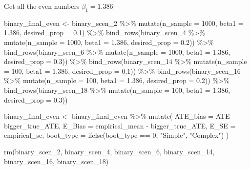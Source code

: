 \documentclass[
]{article}
\newenvironment{Shaded}{\begin{snugshade}}{\end{snugshade}}
\newcommand{\AttributeTok}[1]{\textcolor[rgb]{0.77,0.63,0.00}{#1}}
\newcommand{\DecValTok}[1]{\textcolor[rgb]{0.00,0.00,0.81}{#1}}
\newcommand{\FloatTok}[1]{\textcolor[rgb]{0.00,0.00,0.81}{#1}}
\newcommand{\FunctionTok}[1]{\textcolor[rgb]{0.00,0.00,0.00}{#1}}
\newcommand{\NormalTok}[1]{#1}
\newcommand{\OtherTok}[1]{\textcolor[rgb]{0.56,0.35,0.01}{#1}}
\newcommand{\SpecialCharTok}[1]{\textcolor[rgb]{0.00,0.00,0.00}{#1}}
\newcommand{\StringTok}[1]{\textcolor[rgb]{0.31,0.60,0.02}{#1}}
\begin{document}
Get all the even numbers \(\beta_1 = 1.386\)

\begin{Shaded}
\begin{Highlighting}[]
\NormalTok{binary\_final\_even }\OtherTok{\textless{}{-}} 
\NormalTok{  binary\_scen\_2 }\SpecialCharTok{\%\textgreater{}\%} \FunctionTok{mutate}\NormalTok{(}\AttributeTok{n\_sample =} \DecValTok{1000}\NormalTok{, }\AttributeTok{beta1 =} \FloatTok{1.386}\NormalTok{, }\AttributeTok{desired\_prop =} \FloatTok{0.1}\NormalTok{) }\SpecialCharTok{\%\textgreater{}\%} 
  \FunctionTok{bind\_rows}\NormalTok{(binary\_scen\_4 }\SpecialCharTok{\%\textgreater{}\%} \FunctionTok{mutate}\NormalTok{(}\AttributeTok{n\_sample =} \DecValTok{1000}\NormalTok{, }\AttributeTok{beta1 =} \FloatTok{1.386}\NormalTok{, }\AttributeTok{desired\_prop =} \FloatTok{0.2}\NormalTok{)) }\SpecialCharTok{\%\textgreater{}\%}
 \FunctionTok{bind\_rows}\NormalTok{(binary\_scen\_6 }\SpecialCharTok{\%\textgreater{}\%} \FunctionTok{mutate}\NormalTok{(}\AttributeTok{n\_sample =} \DecValTok{1000}\NormalTok{, }\AttributeTok{beta1 =} \FloatTok{1.386}\NormalTok{, }\AttributeTok{desired\_prop =} \FloatTok{0.3}\NormalTok{)) }\SpecialCharTok{\%\textgreater{}\%}
 \FunctionTok{bind\_rows}\NormalTok{(binary\_scen\_14 }\SpecialCharTok{\%\textgreater{}\%} \FunctionTok{mutate}\NormalTok{(}\AttributeTok{n\_sample =} \DecValTok{100}\NormalTok{, }\AttributeTok{beta1 =} \FloatTok{1.386}\NormalTok{, }\AttributeTok{desired\_prop =} \FloatTok{0.1}\NormalTok{)) }\SpecialCharTok{\%\textgreater{}\%}
 \FunctionTok{bind\_rows}\NormalTok{(binary\_scen\_16 }\SpecialCharTok{\%\textgreater{}\%} \FunctionTok{mutate}\NormalTok{(}\AttributeTok{n\_sample =} \DecValTok{100}\NormalTok{, }\AttributeTok{beta1 =} \FloatTok{1.386}\NormalTok{, }\AttributeTok{desired\_prop =} \FloatTok{0.2}\NormalTok{)) }\SpecialCharTok{\%\textgreater{}\%}
 \FunctionTok{bind\_rows}\NormalTok{(binary\_scen\_18 }\SpecialCharTok{\%\textgreater{}\%} \FunctionTok{mutate}\NormalTok{(}\AttributeTok{n\_sample =} \DecValTok{100}\NormalTok{, }\AttributeTok{beta1 =} \FloatTok{1.386}\NormalTok{, }\AttributeTok{desired\_prop =} \FloatTok{0.3}\NormalTok{))}

\NormalTok{binary\_final\_even }\OtherTok{\textless{}{-}}\NormalTok{ binary\_final\_even }\SpecialCharTok{\%\textgreater{}\%} 
  \FunctionTok{mutate}\NormalTok{(}
    \AttributeTok{ATE\_bias =}\NormalTok{ ATE }\SpecialCharTok{{-}}\NormalTok{ bigger\_true\_ATE,}
    \AttributeTok{E\_Bias =}\NormalTok{ empirical\_mean }\SpecialCharTok{{-}}\NormalTok{ bigger\_true\_ATE,}
    \AttributeTok{E\_SE =}\NormalTok{ empirical\_se,}
    \AttributeTok{boot\_type =} \FunctionTok{ifelse}\NormalTok{(boot\_type }\SpecialCharTok{==} \DecValTok{0}\NormalTok{, }\StringTok{"Simple"}\NormalTok{, }\StringTok{"Complex"}\NormalTok{)}
\NormalTok{  ) }

\FunctionTok{rm}\NormalTok{(binary\_scen\_2, binary\_scen\_4, binary\_scen\_6, binary\_scen\_14, binary\_scen\_16, binary\_scen\_18)}
\end{Highlighting}
\end{Shaded}
\end{document}
